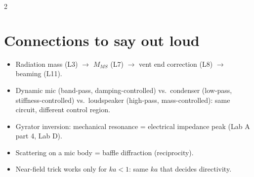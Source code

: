 \documentclass[8pt]{extarticle}
\begin{document}
\begin{multicols}{2}
\section{Connections to say out loud}
\begin{itemize}
\item Radiation mass (L3) $\to$ $M_{MS}$ (L7) $\to$ vent end correction (L8) $\to$ beaming (L11).
\item Dynamic mic (band-pass, damping-controlled) vs.\ condenser (low-pass, stiffness-controlled) vs.\ loudspeaker (high-pass, mass-controlled): same circuit, different control region.
\item Gyrator inversion: mechanical resonance = electrical impedance peak (Lab A part 4, Lab D).
\item Scattering on a mic body = baffle diffraction (reciprocity).
\item Near-field trick works only for $ka<1$: same $ka$ that decides directivity.
\end{itemize}
\end{multicols}
\end{document}
